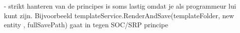 - strikt hanteren van de principes is soms lastig omdat je als programmeur lui kunt zijn.
Bijvoorbeeld templateService.RenderAndSave(templateFolder, new { entity }, fullSavePath)
gaat in tegen SOC/SRP principe